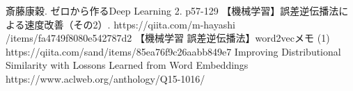 \documentclass[twocolumn]{jarticle}
\begin{document}
\begin{thebibliography}{9}
   斎藤康穀. ゼロから作るDeep Learning 2. p57-129
   【機械学習】誤差逆伝播法による速度改善（その2）. https://qiita.com/m-hayashi\\/items/fa4749f8080e542787d2
   【機械学習 誤差逆伝播法】word2vecメモ (1) https://qiita.com/sand/items/85ea76f9c26aabb849e7
   Improving Distributional Similarity with Lossons Learned from Word Embeddings https://www.aclweb.org/anthology/Q15-1016/
\end{thebibliography}
\end{document}
